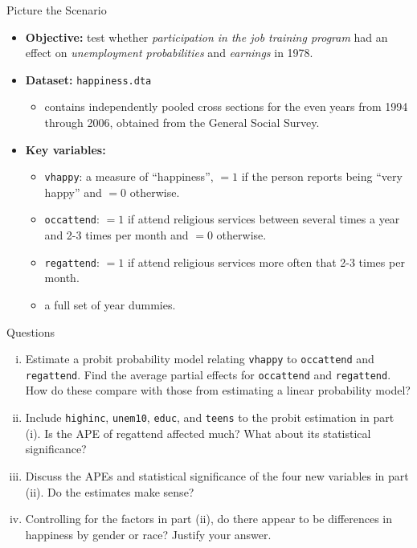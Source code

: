 \documentclass[
  10pt,
  ignorenonframetext,
]{beamer}
\providecommand{\tightlist}{%
  \setlength{\itemsep}{0pt}\setlength{\parskip}{0pt}}
\begin{document}
\begin{frame}[fragile]{Picture the Scenario}
\protect\hypertarget{picture-the-scenario-1}{}
\begin{itemize}
\item
  \textbf{Objective:} test whether \emph{participation in the job
  training program} had an effect on \emph{unemployment probabilities}
  and \emph{earnings} in 1978.
\item
  \textbf{Dataset:} \texttt{happiness.dta}

  \begin{itemize}
  \tightlist
  \item
    contains independently pooled cross sections for the even years from
    1994 through 2006, obtained from the General Social Survey.
  \end{itemize}
\item
  \textbf{Key variables:}

  \begin{itemize}
  \tightlist
  \item
    \texttt{vhappy}: a measure of ``happiness'', \(= 1\) if the person
    reports being ``very happy'' and \(= 0\) otherwise.
  \item
    \texttt{occattend}: \(= 1\) if attend religious services between
    several times a year and 2-3 times per month and \(= 0\) otherwise.
  \item
    \texttt{regattend}: \(= 1\) if attend religious services more often
    that 2-3 times per month.
  \item
    a full set of year dummies.
  \end{itemize}
\end{itemize}
\end{frame}

\begin{frame}[fragile]{Questions}
\protect\hypertarget{questions-3}{}
\begin{enumerate}
[(i)]
\item
  Estimate a probit probability model relating \texttt{vhappy} to
  \texttt{occattend} and \texttt{regattend}. Find the average partial
  effects for \texttt{occattend} and \texttt{regattend}. How do these
  compare with those from estimating a linear probability model?
\item
  Include \texttt{highinc}, \texttt{unem10}, \texttt{educ}, and
  \texttt{teens} to the probit estimation in part (i). Is the APE of
  regattend affected much? What about its statistical significance?
\item
  Discuss the APEs and statistical significance of the four new
  variables in part (ii). Do the estimates make sense?
\item
  Controlling for the factors in part (ii), do there appear to be
  differences in happiness by gender or race? Justify your answer.
\end{enumerate}
\end{frame}
\end{document}
